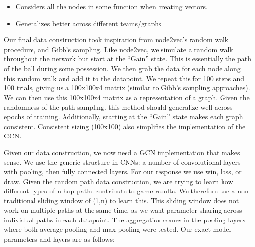 \begin{itemize}
    \item Considers all the nodes in some function when creating vectors.

    \item Generalizes better across different teams/graphs 
\end{itemize}


Our final data construction took inspiration from node2vec's random walk procedure, and Gibb's sampling. Like node2vec, we simulate a random walk throughout the network but start at the ``Gain'' state. This is essentially the path of the ball during some possession.  We then grab the data for each node along this random walk and add it to the datapoint. We repeat this for 100 steps and 100 trials, giving us a 100x100x4 matrix (similar to Gibb's sampling approaches). We can then use this 100x100x4 matrix as a representation of a graph. Given the randomness of the path sampling, this method should generalize well across epochs of training. Additionally, starting at the ``Gain'' state makes each graph consistent. Consistent sizing (100x100) also simplifies the implementation of the GCN. 

Given our data construction, we now need a GCN implementation that makes sense. We use the generic structure in CNNs: a number of convolutional layers with pooling, then fully connected layers. For our response we use win, loss, or draw. Given the random path data construction, we are trying to learn how different types of n-hop paths contribute to game results. We therefore use a non-traditional sliding window of (1,n) to learn this. This sliding window does not work on multiple paths at the same time, as we want parameter sharing across individual paths in each datapoint. The aggregation comes in the pooling layers where both average pooling and max pooling were tested. Our exact model parameters and layers are as follows: 


